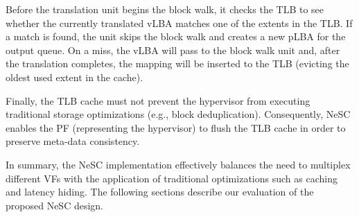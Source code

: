 Before the translation unit begins the block walk, it checks the TLB to see whether the currently translated vLBA matches one of the extents in the TLB. If a match is found, the unit skips the block walk and creates a new pLBA for the output queue.
On a miss, the vLBA will pass to the block walk unit and, after the translation completes, the mapping will be inserted to the TLB (evicting the oldest used extent in the cache).

Finally, the TLB cache must not prevent the hypervisor from executing traditional storage optimizations (e.g., block deduplication). Consequently, NeSC enables the PF (representing the hypervisor) to flush the TLB cache in order to preserve meta-data consistency.


In summary, the NeSC implementation effectively balances the need to multiplex different VFs with the application of traditional optimizations such as caching and latency hiding. The following sections describe our evaluation of the proposed NeSC design.
